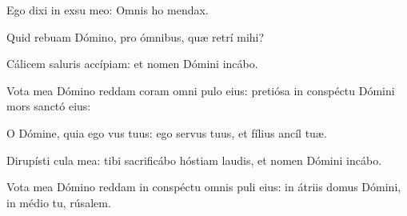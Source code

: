 \item {}

\item Ego dixi in exsu meo:\psstar{} Omnis ho mendax.

\item Quid rebuam Dómino,\psstar{} pro ómnibus, quæ retrí mihi?

\item Cálicem saluris accípiam:\psstar{} et nomen Dómini incábo.

\item Vota mea Dómino reddam coram omni pulo eius:\psstar{} pretiósa in conspéctu Dómini mors sanctó eius:

\item O Dómine, quia ego vus tuus:\psstar{} ego servus tuus, et fílius ancíl tuæ.

\item Dirupísti cula mea:\psstar{} tibi sacrificábo hóstiam laudis, et nomen Dómini incábo.

\item Vota mea Dómino reddam in conspéctu omnis puli eius:\psstar{} in átriis domus Dómini, in médio tu, rúsalem.
